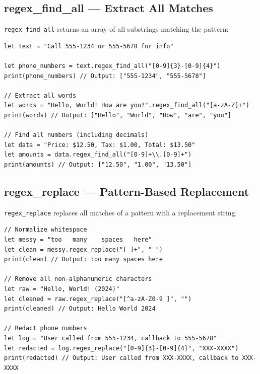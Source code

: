 \subsection{regex\_find\_all --- Extract All Matches}\label{sec:regex-find-all}

\lstinline|regex_find_all| returns an array of all substrings matching the pattern:

\begin{lstlisting}[language=Lattice, caption={Finding all regex matches}]
let text = "Call 555-1234 or 555-5678 for info"

let phone_numbers = text.regex_find_all("[0-9]{3}-[0-9]{4}")
print(phone_numbers) // Output: ["555-1234", "555-5678"]

// Extract all words
let words = "Hello, World! How are you?".regex_find_all("[a-zA-Z]+")
print(words) // Output: ["Hello", "World", "How", "are", "you"]

// Find all numbers (including decimals)
let data = "Price: $12.50, Tax: $1.00, Total: $13.50"
let amounts = data.regex_find_all("[0-9]+\\.[0-9]+")
print(amounts) // Output: ["12.50", "1.00", "13.50"]
\end{lstlisting}

\subsection{regex\_replace --- Pattern-Based Replacement}\label{sec:regex-replace}

\lstinline|regex_replace| replaces all matches of a pattern with a replacement string:

\begin{lstlisting}[language=Lattice, caption={Regex replacement}]
// Normalize whitespace
let messy = "too   many    spaces   here"
let clean = messy.regex_replace("[ ]+", " ")
print(clean) // Output: too many spaces here

// Remove all non-alphanumeric characters
let raw = "Hello, World! (2024)"
let cleaned = raw.regex_replace("[^a-zA-Z0-9 ]", "")
print(cleaned) // Output: Hello World 2024

// Redact phone numbers
let log = "User called from 555-1234, callback to 555-5678"
let redacted = log.regex_replace("[0-9]{3}-[0-9]{4}", "XXX-XXXX")
print(redacted) // Output: User called from XXX-XXXX, callback to XXX-XXXX
\end{lstlisting}

